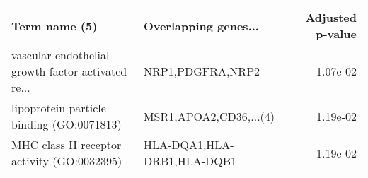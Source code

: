 \begin{tabular}{llr}
\toprule
                                     Term name (5) &       Overlapping genes... &  Adjusted p-value \\
\midrule
vascular endothelial growth factor-activated re... &           NRP1,PDGFRA,NRP2 &          1.07e-02 \\
         lipoprotein particle binding (GO:0071813) &     MSR1,APOA2,CD36,...(4) &          1.19e-02 \\
       MHC class II receptor activity (GO:0032395) & HLA-DQA1,HLA-DRB1,HLA-DQB1 &          1.19e-02 \\
\bottomrule
\end{tabular}
